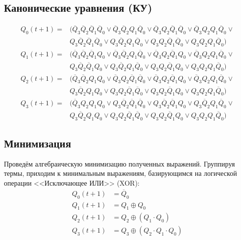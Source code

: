 \documentclass[oneside,a4paper,14pt]{extarticle}
\begin{document}
\subsection{Канонические уравнения (КУ)}
\begin{align*}
  Q_0(t+1) = {} & (\overline{Q}_3\overline{Q}_2\overline{Q}_1\overline{Q}_0 \vee \overline{Q}_3\overline{Q}_2Q_1\overline{Q}_0 \vee \overline{Q}_3Q_2\overline{Q}_1\overline{Q}_0 \vee \overline{Q}_3Q_2Q_1\overline{Q}_0 \vee \\
                & Q_3\overline{Q}_2\overline{Q}_1\overline{Q}_0 \vee Q_3\overline{Q}_2Q_1\overline{Q}_0 \vee Q_3Q_2\overline{Q}_1\overline{Q}_0 \vee Q_3Q_2Q_1\overline{Q}_0) \\[2mm]
  Q_1(t+1) = {} & (\overline{Q}_3\overline{Q}_2\overline{Q}_1Q_0 \vee \overline{Q}_3\overline{Q}_2Q_1\overline{Q}_0 \vee \overline{Q}_3Q_2\overline{Q}_1Q_0 \vee \overline{Q}_3Q_2Q_1\overline{Q}_0 \vee \\
                & Q_3\overline{Q}_2\overline{Q}_1Q_0 \vee Q_3\overline{Q}_2Q_1\overline{Q}_0 \vee Q_3Q_2\overline{Q}_1Q_0 \vee Q_3Q_2Q_1\overline{Q}_0) \\[2mm]
  Q_2(t+1) = {} & (\overline{Q}_3\overline{Q}_2Q_1Q_0 \vee \overline{Q}_3Q_2\overline{Q}_1\overline{Q}_0 \vee \overline{Q}_3Q_2\overline{Q}_1Q_0 \vee \overline{Q}_3Q_2Q_1\overline{Q}_0 \vee \\
                & Q_3\overline{Q}_2Q_1Q_0 \vee Q_3Q_2\overline{Q}_1\overline{Q}_0 \vee Q_3Q_2\overline{Q}_1Q_0 \vee Q_3Q_2Q_1\overline{Q}_0) \\[2mm]
  Q_3(t+1) = {} & (\overline{Q}_3Q_2Q_1Q_0 \vee Q_3\overline{Q}_2\overline{Q}_1\overline{Q}_0 \vee Q_3\overline{Q}_2\overline{Q}_1Q_0 \vee Q_3\overline{Q}_2Q_1\overline{Q}_0 \vee \\
                & Q_3\overline{Q}_2Q_1Q_0 \vee Q_3Q_2\overline{Q}_1\overline{Q}_0 \vee Q_3Q_2\overline{Q}_1Q_0 \vee Q_3Q_2Q_1\overline{Q}_0)
\end{align*}

\subsection{Минимизация}
Проведём алгебраическую минимизацию полученных выражений. Группируя термы, приходим к минимальным выражениям, базирующимся на логической операции <<Исключающее ИЛИ>> (XOR):
\begin{align*}
  Q_0(t+1) &= \overline{Q}_0 \\
  Q_1(t+1) &= Q_1 \oplus Q_0 \\
  Q_2(t+1) &= Q_2 \oplus (Q_1 \cdot Q_0) \\
  Q_3(t+1) &= Q_3 \oplus (Q_2 \cdot Q_1 \cdot Q_0)
\end{align*}
\end{document}
